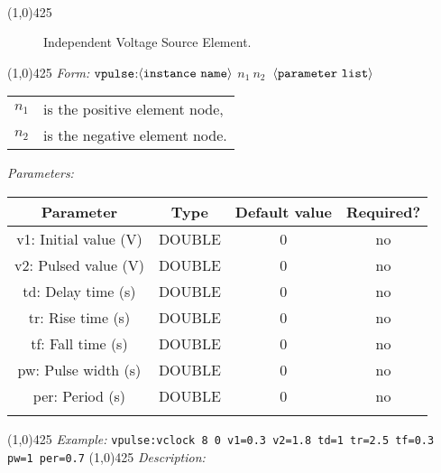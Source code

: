 \documentclass{article}
\begin{document}
\\
\hrulefill\linethickness{0.5mm}\line(1,0){425}
\normalsize
\newline
\begin{figure}[h]
\centerline{\epsfxsize=0.75in}
\caption{Independent Voltage Source Element.}
\end{figure}
\newline
\linethickness{0.5mm} \line(1,0){425}
\newline
\textit{Form:}
$\tt vpulse$:$\langle \tt{instance\ name}\rangle$ $n_1\ n_2\ $
$\langle \tt{parameter\ list}\rangle$
\newline
\begin{tabular}{r l}
$n_1$ & is the positive element node, \\
$n_2$ & is the negative element node. \\
\end{tabular}
\newline
\textit{Parameters:}
\begin{table}[H]
\begin{tabular}{|c|c|c|c|}
\hline
Parameter&Type&Default value&Required?\\
\hline
v1: Initial value (V) & DOUBLE & 0 & no\\
\hline
v2: Pulsed value (V) & DOUBLE & 0 & no\\
\hline
td: Delay time (s) & DOUBLE & 0 & no\\
\hline
tr: Rise time (s) & DOUBLE & 0 & no\\
\hline
tf: Fall time (s) & DOUBLE & 0 & no\\
\hline
pw: Pulse width (s) & DOUBLE & 0 & no\\
\hline
per: Period (s) & DOUBLE & 0 & no\\
\par
\hline
\end{tabular}
\end{table}
\noindent\linethickness{0.5mm}\line(1,0){425}
\newline
\textit{Example:}
\newline
\texttt{vpulse:vclock\ 8\ 0\ v1=0.3 v2=1.8 td=1 tr=2.5 tf=0.3 pw=1
per=0.7}
\newline
\linethickness{0.5mm} \line(1,0){425}
\newline
\textit{Description:}\\
\end{document}
